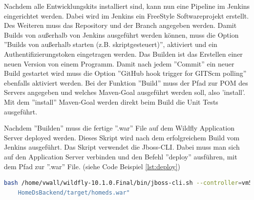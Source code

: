 Nachdem alle Entwicklungskits installiert sind, kann nun eine Pipeline im Jenkins eingerichtet werden. Dabei wird im Jenkins ein FreeStyle Softwareprojekt erstellt. Des Weiteren muss das Repository und der Branch angegeben werden. Damit Builds von außerhalb von Jenkins ausgeführt werden können, muss die Option ''Builds von außerhalb starten (z.B. skriptgesteuert)'', aktiviert und ein Authentifizierungstoken eingetragen werden. Das Builden ist das Erstellen einer neuen Version von einem Programm. Damit nach jedem ''Commit'' ein neuer Build gestartet wird muss die Option ''GitHub hook trigger for GITScm polling'' ebenfalls aktiviert werden. Bei der Funktion ''Build'' muss der Pfad zur POM des Servers angegeben und welches Maven-Goal ausgeführt werden soll, also 'install'. Mit dem ''install'' Maven-Goal werden direkt beim Build die Unit Tests ausgeführt.

Nachdem ''Builden'' muss die fertige ''.war'' File auf dem Wildfly Application Server deployed werden. Dieses Skript wird nach dem erfolgreichem Build vom Jenkins ausgeführt. Das Skript verwendet die Jboss-CLI. Dabei muss man sich auf den Application Server verbinden und den Befehl ''deploy'' ausführen, mit dem Pfad zur ''.war'' File. (siehe Code Beispiel \ref{lst:deploy}) 

\begin{lstlisting}[language=bash,caption={Deploy war-File},label={lst:deploy}]
bash /home/vwall/wildfly-10.1.0.Final/bin/jboss-cli.sh --controller=vm59.htl-leonding.ac.at:9990 --connect -u=USER -p=PASSWORD --command="deploy --force /var/lib/jenkins/workspace/HomeDsSystems_Backend/
	HomeDsBackend/target/homeds.war"
\end{lstlisting}



